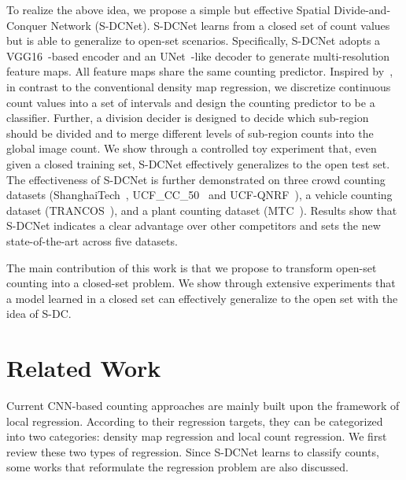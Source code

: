 \documentclass[10pt,twocolumn,letterpaper]{article}
\begin{document}
	To realize the above idea, we propose a simple but effective Spatial Divide-and-Conquer Network (S-DCNet). S-DCNet learns from a closed set of count values but is able to generalize to open-set scenarios. Specifically, \mbox{S-DCNet} adopts a VGG16~\cite{Simonyan2014Very_VGG16}-based encoder and an UNet~\cite{Unet2015U}-like decoder to generate multi-resolution feature maps. All feature maps share the same counting predictor. Inspired by~\cite{li2018deep}, in contrast to the conventional density map regression, we discretize continuous count values into a set of intervals and design the counting predictor to be a classifier. Further, a division decider is designed to decide which sub-region should be divided and to merge different levels of sub-region counts into the global image count. We show through a controlled toy experiment that, even given a closed training set, S-DCNet effectively generalizes to the open test set. The effectiveness of \mbox{S-DCNet} is further demonstrated on three crowd counting datasets (ShanghaiTech~\cite{MCNN_2016_CVPR}, UCF\_CC\_50~\cite{UCFCC50_2013_CVPR} and UCF-QNRF~\cite{Compose_Loss_2018_ECCV}), a vehicle counting dataset (TRANCOS~\cite{TRANCOSdataset_IbPRIA2015}), and a plant counting dataset (MTC~\cite{Lu2017TasselNet}). Results show that S-DCNet indicates a clear advantage over other competitors and sets the new state-of-the-art across five datasets.
	
	The main contribution of this work is that we propose to transform open-set counting into a closed-set problem. We show through extensive experiments that a model learned in a closed set can effectively generalize to the open set with the idea of S-DC. 





	
\section{Related Work}
	Current CNN-based counting approaches are mainly built upon the framework of local regression. According to their regression targets, they can be categorized into two categories: density map regression and local count regression. We first review these two types of regression. Since S-DCNet learns to classify counts, some works that reformulate the regression problem are also discussed.
	
	\vspace{-10pt}
\end{document}
